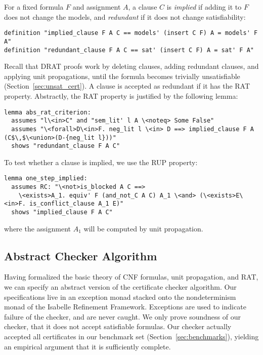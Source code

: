 \documentclass[smallcondensed]{svjour3}     %
\makeatletter
\newcommand{\isai}{\lstinline[language=isabelle,basicstyle=\normalsize\ttfamily\slshape]}
\renewcommand\lstinline[1][]{%
  \leavevmode
  \ifmmode\expandafter\hbox\fi\bgroup
    \def\lst@boxpos{b}%
    \lsthk@PreSet\lstset{flexiblecolumns,#1}%
    \lsthk@TextStyle
    \@ifnextchar\bgroup{\afterassignment\lst@InlineG \let\@let@token}%
                       \lstinline@}
\makeatother
\begin{document}
For a fixed formula $F$ and assignment $A$, a clause $C$ is \emph{implied} if adding it to $F$ does not change the models, 
and \emph{redundant} if it does not change satisfiability:
\begin{lstlisting}
definition "implied_clause F A C == models' (insert C F) A = models' F A"  
definition "redundant_clause F A C == sat' (insert C F) A = sat' F A"
\end{lstlisting}

Recall that DRAT proofs work by deleting clauses, adding redundant clauses, and applying unit propagations, 
until the formula becomes trivially unsatisfiable (\cf Section~\ref{sec:unsat_cert}).
A clause is accepted as redundant if it has the RAT property.
Abstractly, the RAT property is justified by the following lemma:
\begin{lstlisting}
lemma abs_rat_criterion:
  assumes "l\<in>C" and "sem_lit' l A \<noteq> Some False"
  assumes "\<forall>D\<in>F. neg_lit l \<in> D ==> implied_clause F A (C$\,$\<union>(D-{neg_lit l}))"  
  shows "redundant_clause F A C"
\end{lstlisting}
To test whether a clause is implied, we use the RUP property:
\begin{lstlisting}
lemma one_step_implied:
  assumes RC: "\<not>is_blocked A C ==> 
    \<exists>A_1. equiv' F (and_not_C A C) A_1 \<and> (\<exists>E\<in>F. is_conflict_clause A_1 E)"
  shows "implied_clause F A C"
\end{lstlisting}
where the assignment \isai$A_1$ will be computed by unit propagation.





% 
% 
% 

\subsection{Abstract Checker Algorithm}
Having formalized the basic theory of CNF formulas, unit propagation, and RAT, we can specify an abstract version of the certificate checker algorithm.
Our specifications live in an exception monad stacked onto the nondeterminism monad of the Isabelle Refinement Framework.
Exceptions are used to indicate failure of the checker, and are never caught.
%
We only prove soundness of our checker, \ie that it does not accept satisfiable formulas.
Our checker actually accepted all certificates in our benchmark set (\cf Section~\ref{sec:benchmarks}), yielding 
an empirical argument that it is sufficiently complete.
\end{document}
